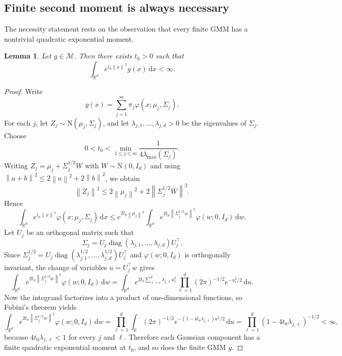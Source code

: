 \documentclass[11pt]{article}
\newtheorem{lemma}[theorem]{Lemma}
\theoremstyle{definition}
\begin{document}
\subsection{Finite second moment is always necessary}

The necessity statement rests on the observation that every finite GMM has a nontrivial quadratic exponential moment.

\begin{lemma}
\label{lem:gauss-exp}
Let $g\in\mathcal M$. Then there exists $t_0>0$ such that
\[
\int_{\mathbb{R}^d} e^{t_0\left\lVert x \right\rVert^2} g(x)\,\mathrm{d}x<\infty.
\]
\end{lemma}

\begin{proof}
Write
\[
g(x)=\sum_{j=1}^m \pi_j\varphi(x;\mu_j,\Sigma_j).
\]
For each $j$, let $Z_j\sim \mathrm{N}(\mu_j,\Sigma_j)$, and let $\lambda_{j,1},\dots,\lambda_{j,d}>0$ be the eigenvalues of $\Sigma_j$. Choose
\[
0<t_0<\min_{1\le j\le m}\frac{1}{4\lambda_{\max}(\Sigma_j)}.
\]
Writing $Z_j=\mu_j+\Sigma_j^{1/2}W$ with $W\sim \mathrm{N}(0,I_d)$ and using $\left\lVert a+b \right\rVert^2\le 2\left\lVert a \right\rVert^2+2\left\lVert b \right\rVert^2$, we obtain
\[
\left\lVert Z_j \right\rVert^2\le 2\left\lVert \mu_j \right\rVert^2+2\left\lVert \Sigma_j^{1/2}W \right\rVert^2.
\]
Hence
\[
\int_{\mathbb{R}^d} e^{t_0\left\lVert x \right\rVert^2}\varphi(x;\mu_j,\Sigma_j)\,\mathrm{d}x
\le e^{2t_0\left\lVert \mu_j \right\rVert^2}
\int_{\mathbb{R}^d} e^{2t_0\left\lVert \Sigma_j^{1/2}w \right\rVert^2}\varphi(w;0,I_d)\,\mathrm{d}w.
\]
Let $U_j$ be an orthogonal matrix such that
\[
\Sigma_j = U_j \operatorname{diag}(\lambda_{j,1},\dots,\lambda_{j,d})U_j^\top.
\]
Since $\Sigma_j^{1/2}=U_j\operatorname{diag}(\lambda_{j,1}^{1/2},\dots,\lambda_{j,d}^{1/2})U_j^\top$ and $\varphi(w;0,I_d)$ is orthogonally invariant, the change of variables $u=U_j^\top w$ gives
\[
\int_{\mathbb{R}^d} e^{2t_0\left\lVert \Sigma_j^{1/2}w \right\rVert^2}\varphi(w;0,I_d)\,\mathrm{d}w
=
\int_{\mathbb{R}^d}
e^{2t_0\sum_{\ell=1}^d \lambda_{j,\ell}u_\ell^2}
\prod_{\ell=1}^d (2\pi)^{-1/2}e^{-u_\ell^2/2}\,\mathrm{d}u.
\]
Now the integrand factorizes into a product of one-dimensional functions, so Fubini's theorem yields
\[
\int_{\mathbb{R}^d} e^{2t_0\left\lVert \Sigma_j^{1/2}w \right\rVert^2}\varphi(w;0,I_d)\,\mathrm{d}w
=
\prod_{\ell=1}^d \int_{\mathbb{R}} (2\pi)^{-1/2} e^{-(1-4t_0\lambda_{j,\ell})u^2/2}\,\mathrm{d}u
=
\prod_{\ell=1}^d (1-4t_0\lambda_{j,\ell})^{-1/2}<\infty,
\]
because $4t_0\lambda_{j,\ell}<1$ for every $j$ and $\ell$. Therefore each Gaussian component has a finite quadratic exponential moment at $t_0$, and so does the finite GMM $g$.
\end{proof}
\end{document}
